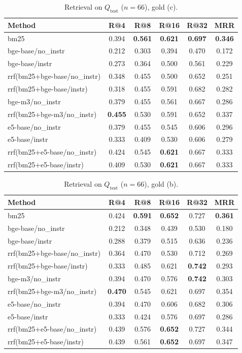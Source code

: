 \begin{table}[t]
\centering
\caption{Retrieval on $Q_{\text{test}}$ ($n=66$), gold (c).}
\begin{tabular}{lccccc}
\toprule
Method & R@4 & R@8 & R@16 & R@32 & MRR \\
\midrule
bm25 & 0.394 & \textbf{0.561} & \textbf{0.621} & \textbf{0.697} & \textbf{0.346} \\
bge-base/no\_instr & 0.212 & 0.303 & 0.394 & 0.470 & 0.172 \\
bge-base/instr & 0.273 & 0.364 & 0.500 & 0.561 & 0.229 \\
rrf(bm25+bge-base/no\_instr) & 0.348 & 0.455 & 0.500 & 0.652 & 0.251 \\
rrf(bm25+bge-base/instr) & 0.318 & 0.455 & 0.591 & 0.682 & 0.282 \\
bge-m3/no\_instr & 0.379 & 0.455 & 0.561 & 0.667 & 0.286 \\
rrf(bm25+bge-m3/no\_instr) & \textbf{0.455} & 0.530 & 0.591 & 0.652 & 0.337 \\
e5-base/no\_instr & 0.379 & 0.455 & 0.545 & 0.606 & 0.296 \\
e5-base/instr & 0.333 & 0.409 & 0.530 & 0.606 & 0.279 \\
rrf(bm25+e5-base/no\_instr) & 0.424 & 0.545 & \textbf{0.621} & 0.667 & 0.333 \\
rrf(bm25+e5-base/instr) & 0.409 & 0.530 & \textbf{0.621} & 0.667 & 0.333 \\
\bottomrule
\end{tabular}
\end{table}

\begin{table}[t]
\centering
\caption{Retrieval on $Q_{\text{test}}$ ($n=66$), gold (b).}
\begin{tabular}{lccccc}
\toprule
Method & R@4 & R@8 & R@16 & R@32 & MRR \\
\midrule
bm25 & 0.424 & \textbf{0.591} & \textbf{0.652} & 0.727 & \textbf{0.361} \\
bge-base/no\_instr & 0.212 & 0.348 & 0.439 & 0.530 & 0.180 \\
bge-base/instr & 0.288 & 0.379 & 0.515 & 0.636 & 0.236 \\
rrf(bm25+bge-base/no\_instr) & 0.364 & 0.470 & 0.530 & 0.712 & 0.269 \\
rrf(bm25+bge-base/instr) & 0.333 & 0.485 & 0.621 & \textbf{0.742} & 0.293 \\
bge-m3/no\_instr & 0.394 & 0.470 & 0.576 & \textbf{0.742} & 0.303 \\
rrf(bm25+bge-m3/no\_instr) & \textbf{0.470} & 0.545 & 0.621 & 0.697 & 0.354 \\
e5-base/no\_instr & 0.394 & 0.470 & 0.606 & 0.682 & 0.306 \\
e5-base/instr & 0.333 & 0.424 & 0.576 & 0.697 & 0.286 \\
rrf(bm25+e5-base/no\_instr) & 0.439 & 0.576 & \textbf{0.652} & 0.727 & 0.344 \\
rrf(bm25+e5-base/instr) & 0.439 & 0.561 & \textbf{0.652} & 0.697 & 0.347 \\
\bottomrule
\end{tabular}
\end{table}
